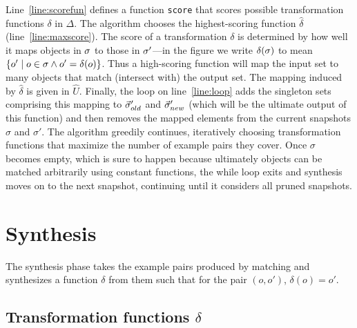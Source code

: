 \documentclass[natbib,10pt]{sigplanconf}
\newcommand{\code}[1]{\lstinline|#1|\xspace}
\newcommand{\mwh}[1]{\textcolor{blue}{Mike: #1}}
\begin{document}
Line~\ref{line:scorefun} defines a function \code{score} that scores possible
transformation functions $\delta$ in $\Delta$. The algorithm chooses
the highest-scoring
function $\hat{\delta}$ (line~\ref{line:maxscore}).  The
score of a transformation $\delta$ is determined by how well it maps
objects in $\sigma$ to those in $\sigma'$---in the figure we write
$\delta(\sigma)$ to mean $\{ o' \mid o \in \sigma \wedge o' = \delta(o)
\}$.  Thus a high-scoring function will map the input set to many
objects that match (intersect with) the output set.  The mapping
induced by $\hat{\delta}$ is given in $\hat{U}$.  
Finally, the loop on line~\ref{line:loop} adds the singleton sets comprising this mapping to
$\vec{\sigma}'_{old}$ and $\vec{\sigma}'_{new}$ (which will be the ultimate
output of this function) and then removes the mapped elements from the
current snapshots $\sigma$ and $\sigma'$. The algorithm greedily
continues, iteratively choosing transformation functions that maximize
the number of example pairs they cover.  Once $\sigma$ becomes
empty, which is sure to happen because ultimately objects can be
matched arbitrarily using constant functions,
the while loop exits and synthesis moves on to the next snapshot, continuing
until it considers all pruned snapshots.



\section{Synthesis}
\label{sec:synthesis}

The synthesis phase takes the example pairs produced by matching and
synthesizes a function $\delta$ from them such that for the pair
$(o,o')$, $\delta(o) = o'$.

\subsection{Transformation functions $\delta$}
\end{document}
